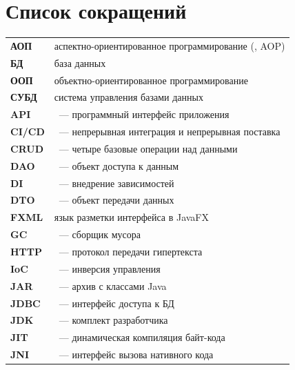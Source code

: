 \chapter*{Список сокращений}

\begin{longtable}{L{2.6cm}L{13.2cm}}
\textbf{АОП} & аспектно-ориентированное программирование
   (, AOP) \\[2pt]
\textbf{БД} & база данных \\[2pt]
\textbf{ООП} & объектно-ориентированное программирование \\[2pt]
\textbf{СУБД} & система управления базами данных \\[2pt]
\textbf{API} & ~--- программный интерфейс
   приложения \\[2pt]
\textbf{CI/CD} & ~---
   непрерывная интеграция и непрерывная поставка \\[2pt]
\textbf{CRUD} & ~--- четыре базовые операции
   над данными \\[2pt]
\textbf{DAO} & ~--- объект доступа к данным \\[2pt]
\textbf{DI} & ~--- внедрение зависимостей \\[2pt]
\textbf{DTO} & ~--- объект передачи данных \\[2pt]
\textbf{FXML} & язык разметки интерфейса в JavaFX \\[2pt]
\textbf{GC} & ~--- сборщик мусора \\[2pt]
\textbf{HTTP} & ~--- протокол передачи
   гипертекста \\[2pt]
\textbf{IoC} & ~--- инверсия управления \\[2pt]
\textbf{JAR} & ~--- архив с классами Java \\[2pt]
\textbf{JDBC} & ~--- интерфейс доступа к БД \\[2pt]
\textbf{JDK} & ~--- комплект разработчика \\[2pt]
\textbf{JIT} & ~--- динамическая компиляция байт-кода \\[2pt]
\textbf{JNI} & ~--- интерфейс вызова нативного кода \\[2pt]

\end{longtable}
